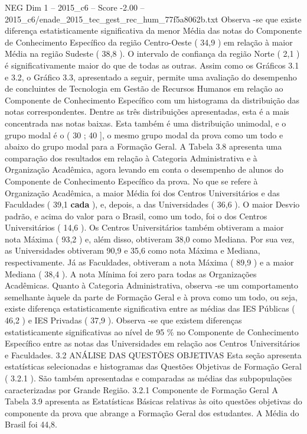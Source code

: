 \begin{textsample}{NEG Dim 1 – 2015\_c6 – Score -2.00 – 2015\_c6/enade\_2015\_tec\_gest\_rec\_hum\_77f5a8062b.txt}
Observa -se que existe diferença estatisticamente significativa da menor Média das notas do Componente de Conhecimento Específico da região Centro-Oeste ( 34,9 ) em relação à maior Média na região Sudeste ( 38,8 ).
O intervalo de confiança da região Norte ( 2,1 ) é significativamente maior do que de todas as outras.
Assim como os Gráficos 3.1 e 3.2, o Gráfico 3.3, apresentado a seguir, permite uma avaliação do desempenho de concluintes de Tecnologia em Gestão de Recursos Humanos em relação ao Componente de Conhecimento Específico com um histograma da distribuição das notas correspondentes.
Dentre as três distribuições apresentadas, esta é a mais concentrada nas notas baixas.
Esta também é uma distribuição unimodal, e o grupo modal é o ( 30 ; 40 ], o mesmo grupo modal da prova como um todo e abaixo do grupo modal para a Formação Geral.
A Tabela 3.8 apresenta uma comparação dos resultados em relação à Categoria Administrativa e à Organização Acadêmica, agora levando em conta o desempenho de alunos do Componente de Conhecimento Específico da prova.
No que se refere à Organização Acadêmica, a maior Média foi dos Centros Universitários e das Faculdades ( 39,1 \textbf{cada} ), e, depois, a das Universidades ( 36,6 ).
O maior Desvio padrão, e acima do valor para o Brasil, como um todo, foi o dos Centros Universitários ( 14,6 ).
Os Centros Universitários também obtiveram a maior nota Máxima ( 93,2 ) e, além disso, obtiveram 38,0 como Mediana.
Por sua vez, as Universidades obtiveram 90,9 e 35,6 como nota Máxima e Mediana, respectivamente.
Já as Faculdades, obtiveram a nota Máxima ( 89,9 ) e a maior Mediana ( 38,4 ).
A nota Mínima foi zero para todas as Organizações Acadêmicas.
Quanto à Categoria Administrativa, observa -se um comportamento semelhante àquele da parte de Formação Geral e à prova como um todo, ou seja, existe diferença estatisticamente significativa entre as médias das IES Públicas ( 46,2 ) e IES Privadas ( 37,9 ).
Observa -se que existem diferenças estatisticamente significativas ao nível de 95 \% no Componente de Conhecimento Específico entre as notas das Universidades em relação aos Centros Universitários e Faculdades. 3.2 ANÁLISE DAS QUESTÕES OBJETIVAS Esta seção apresenta estatísticas selecionadas e histogramas das Questões Objetivas de Formação Geral ( 3.2.1 ).
São também apresentadas e comparadas as médias das subpopulações caracterizadas por Grande Região. 3.2.1 Componente de Formação Geral A Tabela 3.9 apresenta as Estatísticas Básicas relativas às oito questões objetivas do componente da prova que abrange a Formação Geral dos estudantes.
A Média do Brasil foi 44,8.

\end{textsample}
